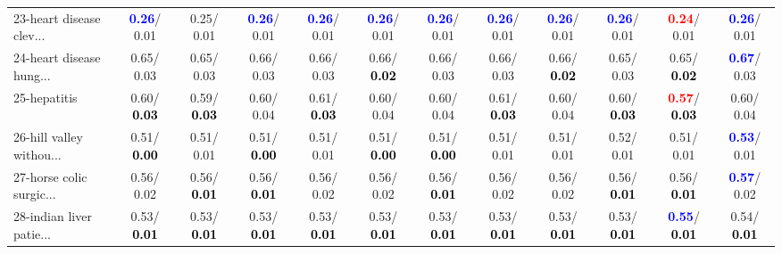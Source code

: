 \begin{table}[h]
\begin{center}
{\begin{tabular}{lc|c|c|c|c|c|c|c|c|c|c}
23-heart disease clev... & \textcolor{blue}{\textbf{  0.26}}/  0.01 &   0.25/  0.01 & \textcolor{blue}{\textbf{  0.26}}/  0.01 & \textcolor{blue}{\textbf{  0.26}}/  0.01 & \textcolor{blue}{\textbf{  0.26}}/  0.01 & \textcolor{blue}{\textbf{  0.26}}/  0.01 & \textcolor{blue}{\textbf{  0.26}}/  0.01 & \textcolor{blue}{\textbf{  0.26}}/  0.01 & \textcolor{blue}{\textbf{  0.26}}/  0.01 & \textcolor{red}{\textbf{  0.24}}/  0.01 & \textcolor{blue}{\textbf{  0.26}}/  0.01 \\
24-heart disease hung... &   0.65/  0.03 &   0.65/  0.03 &   0.66/  0.03 &   0.66/  0.03 &   0.66/\textcolor{black}{\textbf{  0.02}} &   0.66/  0.03 &   0.66/  0.03 &   0.66/\textcolor{black}{\textbf{  0.02}} &   0.65/  0.03 &   0.65/\textcolor{black}{\textbf{  0.02}} & \textcolor{blue}{\textbf{  0.67}}/  0.03 \\
25-hepatitis &   0.60/\textcolor{black}{\textbf{  0.03}} &   0.59/\textcolor{black}{\textbf{  0.03}} &   0.60/  0.04 &   0.61/\textcolor{black}{\textbf{  0.03}} &   0.60/  0.04 &   0.60/  0.04 &   0.61/\textcolor{black}{\textbf{  0.03}} &   0.60/  0.04 &   0.60/\textcolor{black}{\textbf{  0.03}} & \textcolor{red}{\textbf{  0.57}}/\textcolor{black}{\textbf{  0.03}} &   0.60/  0.04 \\
26-hill valley withou... &   0.51/\textcolor{black}{\textbf{  0.00}} &   0.51/  0.01 &   0.51/\textcolor{black}{\textbf{  0.00}} &   0.51/  0.01 &   0.51/\textcolor{black}{\textbf{  0.00}} &   0.51/\textcolor{black}{\textbf{  0.00}} &   0.51/  0.01 &   0.51/  0.01 &   0.52/  0.01 &   0.51/  0.01 & \textcolor{blue}{\textbf{  0.53}}/  0.01 \\
27-horse colic surgic... &   0.56/  0.02 &   0.56/\textcolor{black}{\textbf{  0.01}} &   0.56/\textcolor{black}{\textbf{  0.01}} &   0.56/  0.02 &   0.56/  0.02 &   0.56/\textcolor{black}{\textbf{  0.01}} &   0.56/  0.02 &   0.56/  0.02 &   0.56/\textcolor{black}{\textbf{  0.01}} &   0.56/\textcolor{black}{\textbf{  0.01}} & \textcolor{blue}{\textbf{  0.57}}/  0.02 \\
28-indian liver patie... &   0.53/\textcolor{black}{\textbf{  0.01}} &   0.53/\textcolor{black}{\textbf{  0.01}} &   0.53/\textcolor{black}{\textbf{  0.01}} &   0.53/\textcolor{black}{\textbf{  0.01}} &   0.53/\textcolor{black}{\textbf{  0.01}} &   0.53/\textcolor{black}{\textbf{  0.01}} &   0.53/\textcolor{black}{\textbf{  0.01}} &   0.53/\textcolor{black}{\textbf{  0.01}} &   0.53/\textcolor{black}{\textbf{  0.01}} & \textcolor{blue}{\textbf{  0.55}}/\textcolor{black}{\textbf{  0.01}} &   0.54/\textcolor{black}{\textbf{  0.01}} \\ \hline

\end{tabular}}
\end{center}
\end{table}
